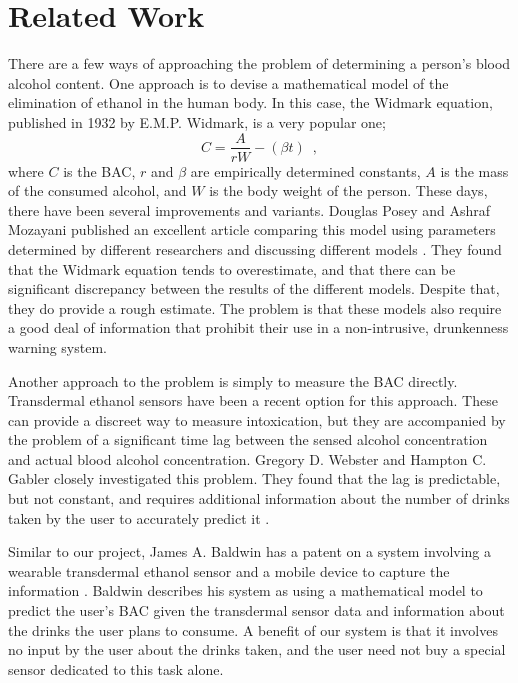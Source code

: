 \section{Related Work}
There are a few ways of approaching the problem of determining a person's blood alcohol content. One approach is to devise a mathematical model of the elimination of ethanol in the human body. In this case, the Widmark equation, published in 1932 by E.M.P. Widmark, is a very popular one; \begin{equation}C=\frac{A}{rW}-(\beta t) \enspace ,
\end{equation} where $C$ is the BAC, $r$ and $\beta$ are empirically determined constants, $A$ is the mass of the consumed alcohol, and $W$ is the body weight of the person. These days, there have been several improvements and variants. Douglas Posey and Ashraf Mozayani published an excellent article comparing this model using parameters determined by different researchers and discussing different models \cite{Posey:2007}. They found that the Widmark equation tends to overestimate, and that there can be significant discrepancy between the results of the different models. Despite that, they do provide a rough estimate. The problem is that these models also require a good deal of information that prohibit their use in a non-intrusive, drunkenness warning system.

Another approach to the problem is simply to measure the BAC directly. Transdermal ethanol sensors have been a recent option for this approach. These can provide a discreet way to measure intoxication, but they are accompanied by the problem of a significant time lag between the sensed alcohol concentration and actual blood alcohol concentration. Gregory D. Webster and Hampton C. Gabler closely investigated this problem. They found that the lag is predictable, but not constant, and requires additional information about the number of drinks taken by the user to accurately predict it \cite{Webster:2007}.

Similar to our project, James A. Baldwin has a patent on a system involving a wearable transdermal ethanol sensor and a mobile device to capture the information \cite{Baldwin:2014}. Baldwin describes his system as using a mathematical model to predict the user's BAC given the transdermal sensor data and information about the drinks the user plans to consume. A benefit of our system is that it involves no input by the user about the drinks taken, and the user need not buy a special sensor dedicated to this task alone.

